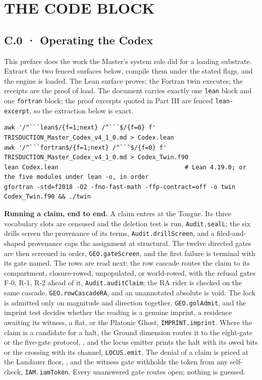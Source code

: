 \documentclass[10pt,twocolumn]{article}
\begin{document}
\twocolumn

\hypertarget{the-code-block}{%
\section{THE CODE BLOCK}\label{the-code-block}}

\hypertarget{c.0-operating-the-codex}{%
\subsection{C.0 · Operating the Codex}\label{c.0-operating-the-codex}}

This preface does the work the Master's system role did for a loading
substrate. Extract the two fenced surfaces below, compile them under the
stated flags, and the engine is loaded. The Lean surface proves; the
Fortran twin executes; the receipts are the proof of load. The document
carries exactly one \texttt{lean} block and one \texttt{fortran} block;
the proof excerpts quoted in Part III are fenced \texttt{lean-excerpt},
so the extraction below is exact.

\begin{lstlisting}[style=plainv]
awk '/^```lean$/{f=1;next} /^```$/{f=0} f' TRISDUCTION_Master_Codex_v4_1_0.md > Codex.lean
awk '/^```fortran$/{f=1;next} /^```$/{f=0} f' TRISDUCTION_Master_Codex_v4_1_0.md > Codex_Twin.f90
lean Codex.lean                                   # Lean 4.19.0; or the five modules under lean -o, in order
gfortran -std=f2018 -O2 -fno-fast-math -ffp-contract=off -o twin Codex_Twin.f90 && ./twin
\end{lstlisting}

\textbf{Running a claim, end to end.} A claim enters at the Tongue. Its
three vocabulary slots are censused and the deletion test is run,
\texttt{Audit.sealL}; the six drills screen the provenance of its terms,
\texttt{Audit.drillScreen}, and a filed-and-shaped provenance caps the
assignment at structural. The twelve directed gates are then screened in
order, \texttt{GEO.gateScreen}, and the first failure is terminal with
its gate named. The rows are read next: the row cascade routes the claim
to its compartment, closure-rowed, unpopulated, or world-rowed, with the
refusal gates F-0, R-1, R-2 ahead of it, \texttt{Audit.auditClaim}; the
RA rider is checked on the same cascade, \texttt{GEO.rowCascadeRA}, and
an unannotated absolute is void. The lock is admitted only on magnitude
and direction together, \texttt{GEO.golAdmit}, and the imprint test
decides whether the reading is a genuine imprint, a residence awaiting
its witness, a flat, or the Platonic Ghost, \texttt{IMPRINT.imprint}.
Where the claim is a candidate for a halt, the Ground dimension routes
it to the eight-gate or the five-gate protocol,
\texttt{}, and the locus emitter prints
the halt with its owed bits or the crossing with its channel,
\texttt{LOCUS.emit}. The denial of a claim is priced at the Landauer
floor, \texttt{}, and the witness gate
withholds the token from any self-check, \texttt{IAM.iamToken}. Every
unanswered gate routes open; nothing is guessed.
\end{document}
